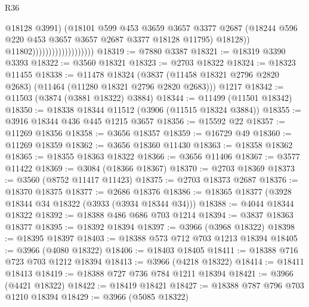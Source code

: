 \begin{lexlean}{R36}
\begin{coremodule}
                                              @18128
                                              @3991)
                                            (@18101
                                              @599
                                              @453
                                              @3659
                                              @3657
                                              @3377
                                              @2687
                                              (@18244
                                                @596
                                                @220
                                                @453
                                                @3657
                                                @3657
                                                @2687
                                                @3377
                                                @18128
                                                @11795)
                                              @18128))
                                          @11802)))))))))))))))))))
@18319 := @7880 @3387
@18321 := @18319 @3390 @3393
@18322 := @3560 @18321
@18323 := @2703 @18322
@18324 := @18323 @11455
@18338 := @11478
    @18324
    (@3837 (@11458 @18321 @2796 @2820 @2683) (@11464 (@11280 @18321 @2796 @2820 @2683)))
    @1217
@18342 := @11503 (@3874 (@3881 @18322) @3884)
@18344 := @11499 (@11501 @18342)
@18350 := @18338 @18344 @11512 (@3906 (@11515 @18324 @3884))
@18355 := @3916 @18344 @436 @445 @1215 @3657
@18356 := @15592 @22
@18357 := @11269 @18356
@18358 := @3656 @18357
@18359 := @16729 @49
@18360 := @11269 @18359
@18362 := @3656 @18360 @11430
@18363 := @18358 @18362
@18365 := @18355 @18363 @18322
@18366 := @3656 @11406
@18367 := @3577 @11422
@18369 := @3084 (@18366 @18367)
@18370 := @2703 @18369
@18373 := @3560 (@8752 @11417 @11423)
@18375 := @2703 @18373 @2687
@18376 := @18370 @18375
@18377 := @2686 @18376
@18386 := @18365 @18377 (@3928 @18344 @34 @18322 (@3933 (@3934 @18344 @34)))
@18388 := @4044 @18344 @18322
@18392 := @18388 @486 @686 @703 @1214
@18394 := @3837 @18363 @18377
@18395 := @18392 @18394
@18397 := @3966 (@3968 @18322)
@18398 := @18395 @18397
@18403 := @18388 @573 @712 @703 @1213 @18394
@18405 := @3966 (@4080 @18322)
@18406 := @18403 @18405
@18411 := @18388 @716 @723 @703 @1212 @18394
@18413 := @3966 (@4218 @18322)
@18414 := @18411 @18413
@18419 := @18388 @727 @736 @784 @1211 @18394
@18421 := @3966 (@4421 @18322)
@18422 := @18419 @18421
@18427 := @18388 @787 @796 @703 @1210 @18394
@18429 := @3966 (@5085 @18322)

\end{coremodule}
\end{lexlean}
